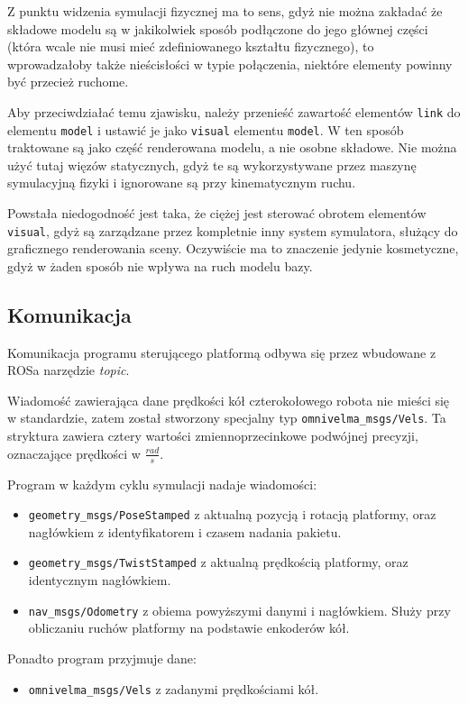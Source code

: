 		Z punktu widzenia symulacji fizycznej ma to sens, gdyż nie można zakładać że składowe modelu są w jakikolwiek sposób podłączone do jego głównej części
		(która wcale nie musi mieć zdefiniowanego kształtu fizycznego), to wprowadzałoby także nieścisłości w typie połączenia, niektóre elementy powinny być przecież ruchome.

		Aby przeciwdziałać temu zjawisku, należy przenieść zawartość elementów \texttt{link} do elementu \texttt{model} i ustawić je jako \texttt{visual} elementu \texttt{model}.
		W ten sposób traktowane są jako część renderowana modelu, a nie osobne składowe.
		Nie można użyć tutaj więzów statycznych, gdyż te są wykorzystywane przez maszynę symulacyjną fizyki i ignorowane są przy kinematycznym ruchu.

		Powstała niedogodność jest taka, że ciężej jest sterować obrotem elementów \texttt{visual}, gdyż są zarządzane przez kompletnie inny system symulatora,
		służący do graficznego renderowania sceny.
		Oczywiście ma to znaczenie jedynie kosmetyczne, gdyż w żaden sposób nie wpływa na ruch modelu bazy.

	\subsection{Komunikacja}
		Komunikacja programu sterującego platformą odbywa się przez wbudowane z ROSa narzędzie \emph{topic}.

		Wiadomość zawierająca dane prędkości kół czterokołowego robota nie mieści się w standardzie, zatem został stworzony specjalny typ \texttt{omnivelma\_msgs/Vels}.
		Ta stryktura zawiera cztery wartości zmiennoprzecinkowe podwójnej precyzji, oznaczające prędkości w $\frac{rad}{s}$.

		Program w każdym cyklu symulacji nadaje wiadomości:
		\begin{itemize}
		\item \texttt{geometry\_msgs/PoseStamped} z aktualną pozycją i rotacją platformy, oraz nagłówkiem z identyfikatorem i czasem nadania pakietu.
		\item \texttt{geometry\_msgs/TwistStamped} z aktualną prędkością platformy, oraz identycznym nagłówkiem.
		\item \texttt{nav\_msgs/Odometry} z obiema powyższymi danymi i nagłówkiem. Służy przy obliczaniu ruchów platformy na podstawie enkoderów kół.
		\end{itemize}
		Ponadto program przyjmuje dane:
		\begin{itemize}
		\item \texttt{omnivelma\_msgs/Vels} z zadanymi prędkościami kół.
		\end{itemize}

